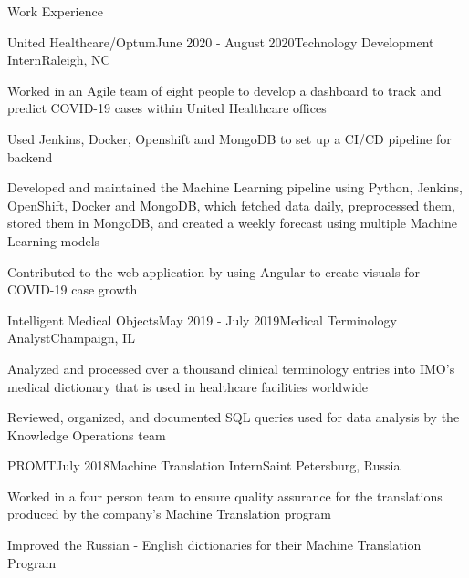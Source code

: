 \documentclass[10pt]{resume} %
\begin{document}
\begin{rSection}{Work Experience}
\begin{rSubsection}{United Healthcare/Optum}{June 2020 - August 2020}{Technology Development Intern}{Raleigh, NC}
\item Worked in an Agile team of eight people to develop a dashboard to track and predict COVID-19 cases within United Healthcare offices
\item Used Jenkins, Docker, Openshift and MongoDB to set up a CI/CD pipeline for backend
\item Developed and maintained the Machine Learning pipeline using Python, Jenkins, OpenShift, Docker and MongoDB, which fetched data daily, preprocessed them, stored them in MongoDB, and created a weekly forecast using multiple Machine Learning models
\item Contributed to the web application by using Angular to create visuals for COVID-19 case growth
\end{rSubsection}

\begin{rSubsection}{Intelligent Medical Objects}{May 2019 - July 2019}{Medical Terminology Analyst}{Champaign, IL}
\item \small Analyzed and processed over a thousand clinical terminology entries into IMO’s medical dictionary that is used in healthcare facilities worldwide
\item Reviewed, organized, and documented SQL queries used for data analysis by the Knowledge Operations team


\end{rSubsection}
\begin{rSubsection}{PROMT}{July 2018}{Machine Translation Intern}{Saint Petersburg, Russia}
\item \small Worked in a four person team to ensure quality assurance for the translations produced by the company’s Machine Translation program
\item Improved the Russian - English dictionaries for their Machine Translation Program

\end{rSubsection}

\end{rSection}


\end{document}
